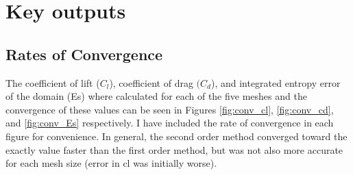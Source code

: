 \documentclass{article}
\begin{document}
\section{Key outputs}

\subsection{Rates of Convergence}

The coefficient of lift ($C_l$), coefficient of drag $(C_d$), and integrated entropy error of the domain (Es) where calculated for each of the five meshes and the convergence of these values can be seen in Figures \ref{fig:conv_cl}, \ref{fig:conv_cd}, and \ref{fig:conv_Es} respectively.
I have included the rate of convergence in each figure for convenience.
In general, the second order method converged toward the exactly value faster than the first order method, but was not also more accurate for each mesh size (error in cl was initially worse).
\end{document}
